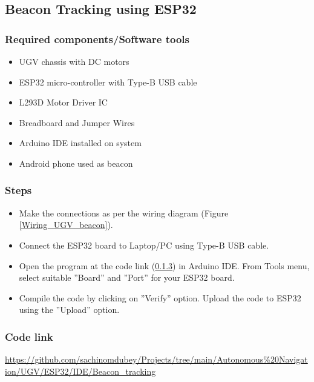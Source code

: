 \clearpage
\newpage
\subsection{Beacon Tracking using ESP32} 
\subsubsection{Required components/Software tools}
\begin{itemize}
    \item  UGV chassis with DC motors
    \item  ESP32 micro-controller with Type-B USB cable
    \item  L293D Motor Driver IC
    \item  Breadboard and Jumper Wires
    \item  Arduino IDE installed on system
    \item  Android phone used as beacon
\end{itemize}



\subsubsection{Steps}
\begin{itemize}
    \item Make the connections as per the wiring diagram (Figure \ref{Wiring_UGV_beacon}).
    \item Connect the ESP32 board to Laptop/PC using Type-B USB cable.
    \item Open the program at the code link (\ref{code_link_ESP32_beacon}) in Arduino IDE. From Tools menu, select suitable ”Board” and ”Port” for your ESP32 board.
    \item Compile the code by clicking on ”Verify” option. Upload the code to ESP32 using the ”Upload” option.
\end{itemize}

\subsubsection{{Code link}} \label{code_link_ESP32_beacon}
\begin{tcolorbox}
\url{https://github.com/sachinomdubey/Projects/tree/main/Autonomous\%20Navigation/UGV/ESP32/IDE/Beacon_tracking}
\end{tcolorbox}

